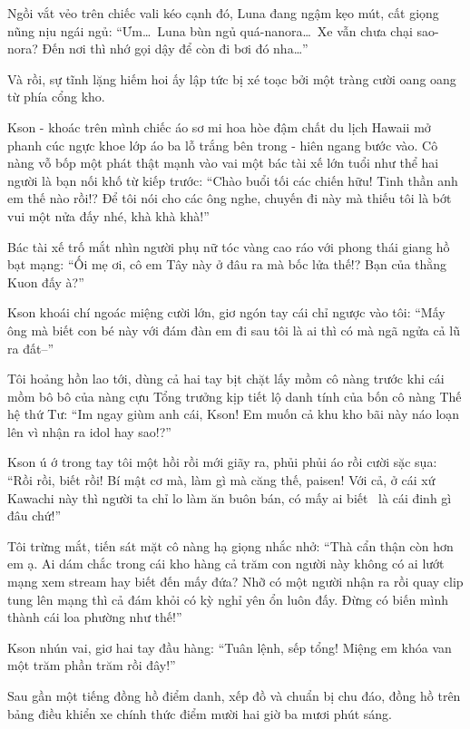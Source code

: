 \documentclass[../main.tex]{subfiles}
\begin{document}
Ngồi vắt vẻo trên chiếc vali kéo cạnh đó, Luna đang ngậm kẹo mút, cất giọng nũng nịu ngái ngủ: ``Ưm\dots\ Luna bùn ngủ quá-nanora\dots\ Xe vẫn chưa chại sao-nora? Đến nơi thì nhớ gọi dậy để còn đi bơi đó nha\dots''

Và rồi, sự tĩnh lặng hiếm hoi ấy lập tức bị xé toạc bởi một tràng cười oang oang từ phía cổng kho.

Kson - khoác trên mình chiếc áo sơ mi hoa hòe đậm chất du lịch Hawaii mở phanh cúc ngực khoe lớp áo ba lỗ trắng bên trong - hiên ngang bước vào. Cô nàng vỗ bốp một phát thật mạnh vào vai một bác tài xế lớn tuổi như thể hai người là bạn nối khố từ kiếp trước: ``Chào buổi tối các chiến hữu! Tinh thần anh em thế nào rồi!? Để tôi nói cho các ông nghe, chuyến đi này mà thiếu tôi là bớt vui một nửa đấy nhé, khà khà khà!''

Bác tài xế trố mắt nhìn người phụ nữ tóc vàng cao ráo với phong thái giang hồ bạt mạng: ``Ối mẹ ơi, cô em Tây này ở đâu ra mà bốc lửa thế!? Bạn của thằng Kuon đấy à?''

Kson khoái chí ngoác miệng cười lớn, giơ ngón tay cái chỉ ngược vào tôi: ``Mấy ông mà biết con bé này với đám đàn em đi sau tôi là ai thì có mà ngã ngửa cả lũ ra đất--''

Tôi hoảng hồn lao tới, dùng cả hai tay bịt chặt lấy mồm cô nàng trước khi cái mồm bô bô của nàng cựu Tổng trưởng kịp tiết lộ danh tính của bốn cô nàng Thế hệ thứ Tư: ``Im ngay giùm anh cái, Kson! Em muốn cả khu kho bãi này náo loạn lên vì nhận ra idol hay sao!?''

Kson ú ớ trong tay tôi một hồi rồi mới giãy ra, phủi phủi áo rồi cười sặc sụa: ``Rồi rồi, biết rồi! Bí mật cơ mà, làm gì mà căng thế, paisen! Với cả, ở cái xứ Kawachi này thì người ta chỉ lo làm ăn buôn bán, có mấy ai biết \hll\ là cái đinh gì đâu chứ!''

Tôi trừng mắt, tiến sát mặt cô nàng hạ giọng nhắc nhở: ``Thà cẩn thận còn hơn em ạ. Ai dám chắc trong cái kho hàng cả trăm con người này không có ai lướt mạng xem stream hay biết đến mấy đứa? Nhỡ có một người nhận ra rồi quay clip tung lên mạng thì cả đám khỏi có kỳ nghỉ yên ổn luôn đấy. Đừng có biến mình thành cái loa phường như thế!''

Kson nhún vai, giơ hai tay đầu hàng: ``Tuân lệnh, sếp tổng! Miệng em khóa van một trăm phần trăm rồi đây!''

\ct

Sau gần một tiếng đồng hồ điểm danh, xếp đồ và chuẩn bị chu đáo, đồng hồ trên bảng điều khiển xe chính thức điểm mười hai giờ ba mươi phút sáng.
\end{document}
